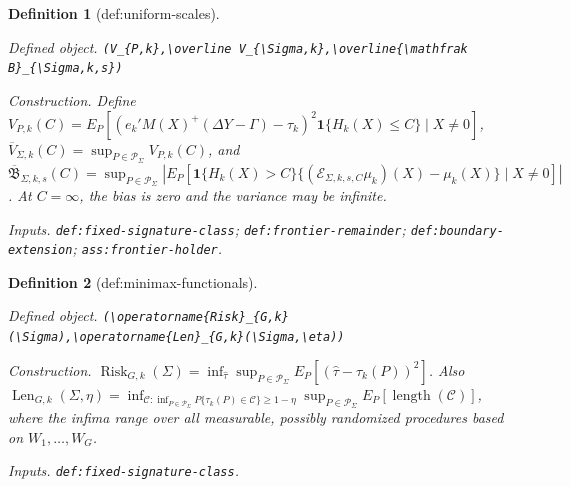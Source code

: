\documentclass{article}
\newtheorem{definition}{Definition}
\begin{document}
\begin{definition}[def:uniform-scales]\label{def:uniform-scales}
\par\smallskip\noindent\emph{Defined object.} \texttt{(V\_\allowbreak{}\{P,\allowbreak{}k\}\allowbreak{},\allowbreak{}\textbackslash{}\allowbreak{}overline V\_\allowbreak{}\{\textbackslash{}\allowbreak{}Sigma,\allowbreak{}k\}\allowbreak{},\allowbreak{}\textbackslash{}\allowbreak{}overline\{\textbackslash{}\allowbreak{}mathfrak B\}\allowbreak{}\_\allowbreak{}\{\textbackslash{}\allowbreak{}Sigma,\allowbreak{}k,\allowbreak{}s\}\allowbreak{})}
\par\smallskip\noindent\emph{Construction.} Define \(V_{P,k}(C)=E_P[(e_k'M(X)^+(\Delta Y-\Gamma)-\tau_k)^2\mathbf 1\{H_k(X)\le C\}\mid X\ne0]\), \(\overline V_{\Sigma,k}(C)=\sup_{P\in\mathcal P_\Sigma}V_{P,k}(C)\), and \(\overline{\mathfrak B}_{\Sigma,k,s}(C)=\sup_{P\in\mathcal P_\Sigma}|E_P[\mathbf 1\{H_k(X)>C\}\{(\mathcal E_{\Sigma,k,s,C}\mu_k)(X)-\mu_k(X)\}\mid X\ne0]|\). At \(C=\infty\), the bias is zero and the variance may be infinite.
\par\smallskip\noindent\emph{Inputs.} \texttt{def:\allowbreak{}fixed-\allowbreak{}signature-\allowbreak{}class}; \texttt{def:\allowbreak{}frontier-\allowbreak{}remainder}; \texttt{def:\allowbreak{}boundary-\allowbreak{}extension}; \texttt{ass:\allowbreak{}frontier-\allowbreak{}holder}.
\end{definition}

\begin{definition}[def:minimax-functionals]\label{def:minimax-functionals}
\par\smallskip\noindent\emph{Defined object.} \texttt{(\textbackslash{}\allowbreak{}operatorname\{Risk\}\allowbreak{}\_\allowbreak{}\{G,\allowbreak{}k\}\allowbreak{}(\textbackslash{}\allowbreak{}Sigma),\allowbreak{}\textbackslash{}\allowbreak{}operatorname\{Len\}\allowbreak{}\_\allowbreak{}\{G,\allowbreak{}k\}\allowbreak{}(\textbackslash{}\allowbreak{}Sigma,\allowbreak{}\textbackslash{}\allowbreak{}eta))}
\par\smallskip\noindent\emph{Construction.} \(\operatorname{Risk}_{G,k}(\Sigma)=\inf_{\widehat\tau}\sup_{P\in\mathcal P_\Sigma}E_P[(\widehat\tau-\tau_k(P))^2]\). Also \(\operatorname{Len}_{G,k}(\Sigma,\eta)=\inf_{\mathcal C:\inf_{P\in\mathcal P_\Sigma}P\{\tau_k(P)\in\mathcal C\}\ge1-\eta}\sup_{P\in\mathcal P_\Sigma}E_P[\operatorname{length}(\mathcal C)]\), where the infima range over all measurable, possibly randomized procedures based on \(W_1,\ldots,W_G\).
\par\smallskip\noindent\emph{Inputs.} \texttt{def:\allowbreak{}fixed-\allowbreak{}signature-\allowbreak{}class}.
\end{definition}
\end{document}
